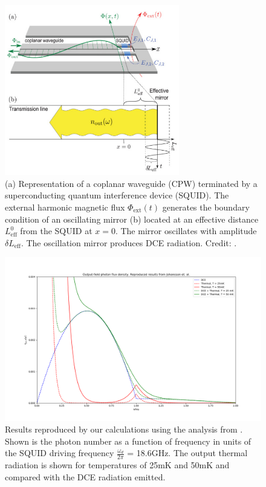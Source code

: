 \begin{figure}
    \centering
    \includegraphics[width=3in, keepaspectratio]{figures/intro/Johansson2010_effectivemirror.png}
    \caption{(a) Representation of a coplanar waveguide (CPW) terminated by a superconducting quantum interference device (SQUID). 
    The external harmonic magnetic flux $\Phi_{\text{ext}}(t)$ generates 
    the boundary condition of an oscillating mirror (b) located at an effective distance $L^0_{\text{eff}}$ from the SQUID at $x=0$. The mirror oscillates with amplitude $\delta L_{\text{eff}}$. The oscillation mirror produces DCE radiation. Credit: \protect\cite{Johansson2010}.}
    \label{fig:Johansson2010_effectivemirror}
\end{figure}


\begin{figure}
    \centering
    \includegraphics[width=6.5in,keepaspectratio]{figures/intro/Johansson2010_reproduced.png}
    \caption{Results reproduced by our calculations using the analysis from \protect\cite{Johansson2010}. 
    Shown is the photon number as a function of frequency in units of the SQUID driving frequency $\frac{\omega_d}{2\pi}$ = 18.6GHz. The output thermal radiation is shown for temperatures of 25mK and 50mK and compared with the DCE radiation emitted.}
    \label{fig:Johansson2010_reproduced}
\end{figure}

